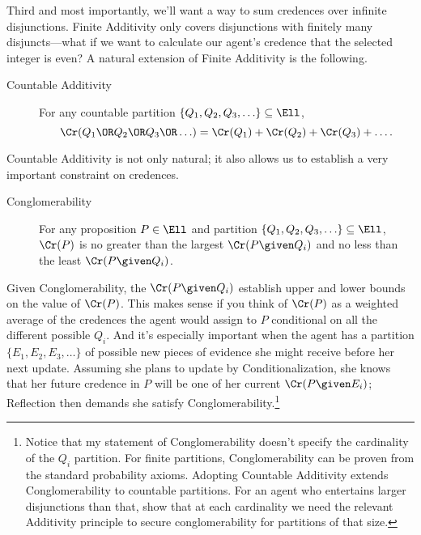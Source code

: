 Third and most importantly, we'll want a way to sum credences over infinite disjunctions. Finite Additivity only covers disjunctions with finitely many disjuncts---what if we want to calculate our agent's credence that the selected integer is even? A natural extension of Finite Additivity is the following.
\begin{description}
\item[Countable Additivity]{For any countable partition $\{Q_1, Q_2, Q_3, \ldots\} \subseteq \Ell$,
\begin{equation*}
\Cr(Q_1 \OR Q_2 \OR Q_3 \OR \ldots)=\Cr(Q_1)+\Cr(Q_2)+\Cr(Q_3)+\ldots.
\end{equation*}}
\end{description}
Countable Additivity is not only natural; it also allows us to establish a very important constraint on credences.
\begin{description}
\item[Conglomerability]{For any proposition $P \in \Ell$ and partition $\{Q_1, Q_2, \allowbreak Q_3, \ldots\} \subseteq \Ell$, $\Cr(P)$ is no greater than the largest $\Cr(P \given Q_i)$ and no less than the least $\Cr(P \given Q_i)$.}
\end{description} 
Given Conglomerability, the $\Cr(P \given Q_i)$ establish upper and lower bounds on the value of $\Cr(P)$. This makes sense if you think of $\Cr(P)$ as a weighted average of the credences the agent would assign to $P$ conditional on all the different possible $Q_i$. And it's especially important when the agent has a partition $\{E_1, E_2, E_3, \ldots\}$ of possible new pieces of evidence she might receive before her next update. Assuming she plans to update by Conditionalization, she knows that her future credence in $P$ will be one of her current $\Cr(P \given E_i)$; Reflection then demands she satisfy Conglomerability.\footnote
{Notice that my statement of Conglomerability doesn't specify the cardinality of the $Q_i$ partition. For finite partitions, Conglomerability can be proven from the standard probability axioms. Adopting Countable Additivity extends Conglomerability to countable partitions. For an agent who entertains larger disjunctions than that, \citet{SeidenfeldNonconglomerability} show that at each cardinality we need the relevant Additivity principle to secure conglomerability for partitions of that size.}


